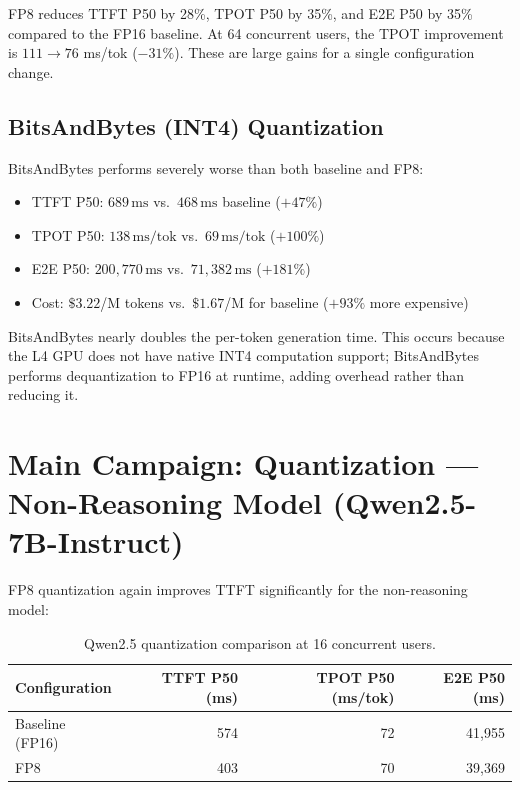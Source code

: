 \documentclass[a4paper,12pt]{report}
\begin{document}
FP8 reduces TTFT P50 by 28\%, TPOT P50 by 35\%, and E2E P50 by 35\% compared to the FP16 baseline. At 64 concurrent users, the TPOT improvement is $111 \to 76$ ms/tok ($-31\%$). These are large gains for a single configuration change.

\subsection{BitsAndBytes (INT4) Quantization}

BitsAndBytes performs severely worse than both baseline and FP8:

\begin{itemize}
    \item TTFT P50: $689\,\text{ms}$ vs.\ $468\,\text{ms}$ baseline ($+47\%$)
    \item TPOT P50: $138\,\text{ms/tok}$ vs.\ $69\,\text{ms/tok}$ ($+100\%$)
    \item E2E P50: $200{,}770\,\text{ms}$ vs.\ $71{,}382\,\text{ms}$ ($+181\%$)
    \item Cost: $\$3.22$/M tokens vs.\ $\$1.67$/M for baseline ($+93\%$ more expensive)
\end{itemize}

BitsAndBytes nearly doubles the per-token generation time. This occurs because the L4 GPU does not have native INT4 computation support; BitsAndBytes performs dequantization to FP16 at runtime, adding overhead rather than reducing it.

\section{Main Campaign: Quantization --- Non-Reasoning Model (Qwen2.5-7B-Instruct)}

FP8 quantization again improves TTFT significantly for the non-reasoning model:

\begin{table}[h!]
\caption{Qwen2.5 quantization comparison at 16 concurrent users.}
\centering
\begin{tabular}{|l|r|r|r|}
\hline
\textbf{Configuration} & \textbf{TTFT P50 (ms)} & \textbf{TPOT P50 (ms/tok)} & \textbf{E2E P50 (ms)} \\
\hline
Baseline (FP16) & 574 & 72 & 41{,}955 \\
FP8 & 403 & 70 & 39{,}369 \\
\hline
\end{tabular}
\label{table:quant_nonreasoning}
\end{table}
\end{document}
